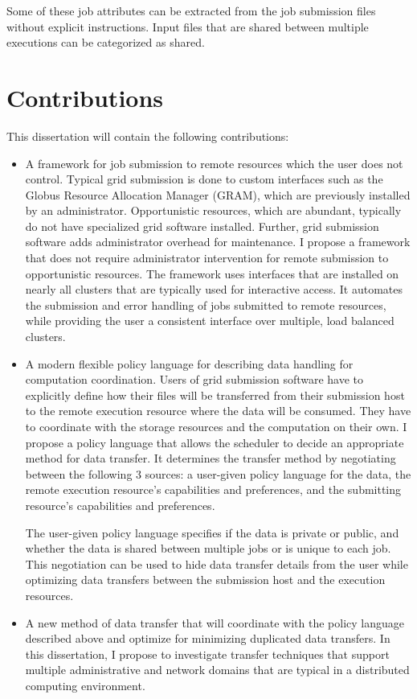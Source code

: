 Some of these job attributes can be extracted from the job submission files without explicit instructions.  Input files that are shared between multiple executions can be categorized as shared.




\section{Contributions}

This dissertation will contain the following contributions:

\begin{itemize}

\item A framework for job submission to remote resources which the user does not control.  Typical grid submission is done to custom interfaces such as the Globus Resource Allocation Manager \cite{foster1999globus} (GRAM), which are previously installed by an administrator.  Opportunistic resources, which are abundant, typically do not have specialized grid software installed.  Further, grid submission software adds administrator overhead for maintenance.  I propose a framework that does not require administrator intervention for remote submission to opportunistic resources.  The framework uses interfaces that are installed on nearly all clusters that are typically used for interactive access.  It automates the submission and error handling of jobs submitted to remote resources, while providing the user a consistent interface over multiple, load balanced clusters.

\item A modern flexible policy language for describing data handling for computation coordination.  Users of grid submission software have to explicitly define how their files will be transferred from their submission host to the remote execution resource where the data will be consumed.  They have to coordinate with the storage resources and the computation on their own.  I propose a policy language that allows the scheduler to decide an appropriate method for data transfer.  It determines the transfer method by negotiating between the following 3 sources: a user-given policy language for the data, the remote execution resource's capabilities and preferences, and the submitting resource's capabilities and preferences.  

The user-given policy language specifies if the data is private or public, and whether the data is shared between multiple jobs or is unique to each job.  This negotiation can be used to hide data transfer details from the user while optimizing data transfers between the submission host and the execution resources.

\item A new method of data transfer that will coordinate with the policy language described above and optimize for minimizing duplicated data transfers.  In this dissertation, I propose to investigate transfer techniques that support multiple administrative and network domains that are typical in a distributed computing environment.

\end{itemize}

